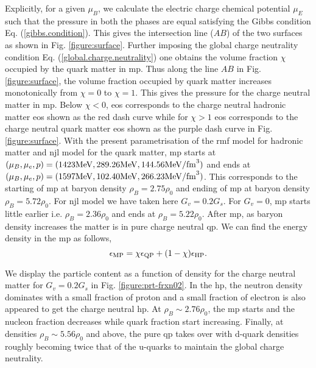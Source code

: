 \documentclass[a4paper, 11pt]{article}
\begin{document}
Explicitly, for a given $\mu_B$, we calculate the electric charge chemical potential $\mu_E$ such that the pressure in both the phases are equal satisfying the Gibbs condition Eq. (\ref{gibbs.condition}). This gives the intersection line ($AB$) of the two surfaces as shown in Fig. \ref{figure:surface}. Further imposing the global charge neutrality condition Eq. (\ref{global.charge.neutrality}) one obtains the volume fraction $\chi$ occupied by the quark matter in \ac{mp}. Thus along the line $AB$ in Fig. \ref{figure:surface}, the volume fraction occupied by quark matter increases monotonically from $\chi=0$ to $\chi=1$. This gives the pressure for the charge neutral matter in \ac{mp}. Below $\chi<0$, \ac{eos} corresponds to the charge neutral hadronic matter \ac{eos} shown as the red dash curve while for $\chi>1$ \ac{eos} corresponds to the charge neutral quark matter \ac{eos} shown as the purple dash curve in Fig. \ref{figure:surface}. With the present parametrisation of the \ac{rmf} model for hadronic matter and \ac{njl} model for the quark matter, \ac{mp} starts at $(\mu_B,\mu_e,p) = (1423 \rm{MeV}, 289.26 \rm{MeV}, 144.56 \rm{MeV/fm}^3)$ and ends at $(\mu_B,\mu_e,p) = (1597 \rm{MeV}, 102.40 \rm{MeV}, 266.23 \rm{MeV/fm}^3)$. This corresponds to the starting of \ac{mp} at baryon density $\rho_B= 2.75 \rho_0$ and ending of \ac{mp} at baryon density $\rho_B = 5.72 \rho_0$. For \ac{njl} model we have taken here $G_v=0.2G_s$. For $G_v=0$, \ac{mp} starts little earlier i.e. $\rho_B = 2.36 \rho_0$ and ends at $\rho_B = 5.22 \rho_0$. After \ac{mp}, as baryon density increases the matter is in pure charge neutral \ac{qp}. We can find the energy density in the \ac{mp} as follows,
\begin{equation}
\label{eq.enrg.denst.mp}
\epsilon_{\rm MP} = \chi \epsilon_{\rm QP} + (1-\chi) \epsilon_{\rm HP}.
\end{equation}

We display the particle content as a function of density for the charge neutral matter 
for $G_v=0.2 G_s$ in Fig. \ref{figure:prt-frxn02}. In the \ac{hp}, the neutron density dominates with a
 small fraction of proton and a small fraction of electron is also appeared to get the charge neutral \ac{hp}. At
 $\rho_B \sim 2.76 \rho_0$, the \ac{mp} starts and the nucleon fraction decreases while quark fraction start increasing. 
Finally, at densities $\rho_B \sim 5.56 \rho_0$ and above, the pure \ac{qp} takes over with d-quark densities roughly becoming twice that of the u-quarks to maintain the global charge neutrality. 
\end{document}
